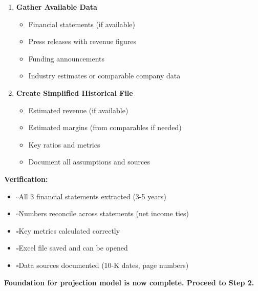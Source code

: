\documentclass[11pt]{article}
\newcommand{\UncheckedBox}{$\square$}
\begin{document}
\begin{enumerate}[leftmargin=*,itemsep=2pt,topsep=2pt]
\item {} \textbf{Gather Available Data}
\begin{itemize}[leftmargin=*,itemsep=2pt,topsep=2pt]
\item {} Financial statements (if available)
\item {} Press releases with revenue figures
\item {} Funding announcements
\item {} Industry estimates or comparable company data
\end{itemize}
\item {} \textbf{Create Simplified Historical File}
\begin{itemize}[leftmargin=*,itemsep=2pt,topsep=2pt]
\item {} Estimated revenue (if available)
\item {} Estimated margins (from comparables if needed)
\item {} Key ratios and metrics
\item {} Document all assumptions and sources
\end{itemize}
\end{enumerate}

\textbf{Verification:}

\begin{itemize}[leftmargin=*,itemsep=2pt,topsep=2pt]
\item {} \UncheckedBox All 3 financial statements extracted (3-5 years)
\item {} \UncheckedBox Numbers reconcile across statements (net income ties)
\item {} \UncheckedBox Key metrics calculated correctly
\item {} \UncheckedBox Excel file saved and can be opened
\item {} \UncheckedBox Data sources documented (10-K dates, page numbers)
\end{itemize}

\textbf{Foundation for projection model is now complete. Proceed to Step 2.}
\end{document}
